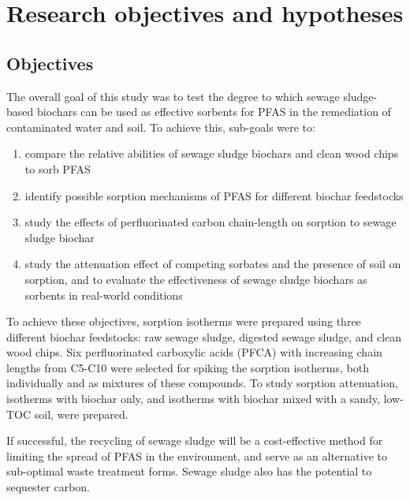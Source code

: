\chapter{Research objectives and hypotheses}\label{chap:Objectives}
\section{Objectives}\label{sec:objectives}
The overall goal of this study was to test the degree to which sewage sludge-based biochars can be used as effective sorbents for PFAS in the remediation of contaminated water and soil. To achieve this, sub-goals were to:

\begin{enumerate}[label=\Roman*]
    \item{compare the relative abilities of sewage sludge biochars and clean wood chips to sorb PFAS}
    \item{identify possible sorption mechanisms of PFAS for different biochar feedstocks}
    \item{study the effects of perfluorinated carbon chain-length on sorption to sewage sludge biochar}
    \item{study the attenuation effect of competing sorbates and the presence of soil on sorption, and to evaluate the effectiveness of sewage sludge biochars as sorbents in real-world conditions}
\end{enumerate}

To achieve these objectives, sorption isotherms were prepared using three different biochar feedstocks: raw sewage sludge, digested sewage sludge, and clean wood chips. Six perfluorinated carboxylic acids (PFCA) with increasing chain lengths from C5-C10 were selected for spiking the sorption isotherms, both individually and as mixtures of these compounds. To study sorption attenuation, isotherms with biochar only, and isotherms with biochar mixed with a sandy, low-TOC soil, were prepared.

If successful, the recycling of sewage sludge will be a cost-effective method for limiting the spread of PFAS in the environment, and serve as an alternative to sub-optimal waste treatment forms. Sewage sludge also has the potential to sequester carbon.

